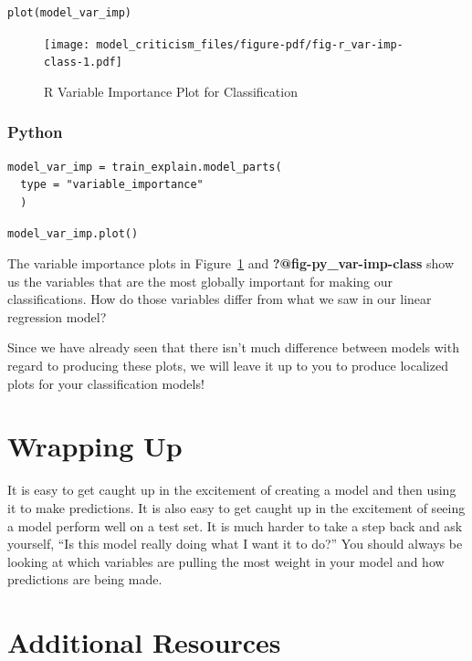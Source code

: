 \documentclass[
  letterpaper,
]{krantz}
\begin{document}
\begin{verbatim}
plot(model_var_imp)
\end{verbatim}

\begin{figure}[H]

{\centering \texttt{[image: model\_criticism\_files/figure-pdf/fig-r\_var-imp-class-1.pdf]}

}

\caption{\label{fig-r_var-imp-class}R Variable Importance Plot for
Classification}

\end{figure}

\subsubsection{Python}

\begin{verbatim}
model_var_imp = train_explain.model_parts(
  type = "variable_importance"
  )
\end{verbatim}

\begin{verbatim}
model_var_imp.plot()
\end{verbatim}

The variable importance plots in Figure~\ref{fig-r_var-imp-class} and
\textbf{?@fig-py\_var-imp-class} show us the variables that are the most
globally important for making our classifications. How do those
variables differ from what we saw in our linear regression model?

Since we have already seen that there isn't much difference between
models with regard to producing these plots, we will leave it up to you
to produce localized plots for your classification models!

\section{Wrapping Up}\label{wrapping-up}

It is easy to get caught up in the excitement of creating a model and
then using it to make predictions. It is also easy to get caught up in
the excitement of seeing a model perform well on a test set. It is much
harder to take a step back and ask yourself, ``Is this model really
doing what I want it to do?'' You should always be looking at which
variables are pulling the most weight in your model and how predictions
are being made.

\section{Additional Resources}\label{additional-resources}
\end{document}
